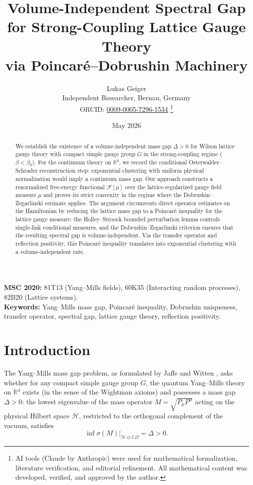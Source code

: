 \documentclass[12pt,a4paper]{article}
\title{\textbf{Volume-Independent Spectral Gap for Strong-Coupling Lattice Gauge Theory\\ via Poincar\'e--Dobrushin Machinery}}
\author{Lukas Geiger\\
\small Independent Researcher, Bernau, Germany\\
\small ORCID: \href{https://orcid.org/0009-0005-7296-1534}{0009-0005-7296-1534}%
\thanks{AI tools (Claude by Anthropic) were used for mathematical formalization, literature verification, and editorial refinement. All mathematical content was developed, verified, and approved by the author.}}
\date{May 2026}
\theoremstyle{definition}
\theoremstyle{plain}
\theoremstyle{remark}
\begin{document}
\maketitle

\noindent\textbf{MSC 2020:} 81T13 (Yang--Mills fields), 60K35 (Interacting random processes), 82B20 (Lattice systems).\\
\textbf{Keywords:} Yang--Mills mass gap, Poincar\'e inequality, Dobrushin uniqueness, transfer operator, spectral gap, lattice gauge theory, reflection positivity.

\begin{abstract}
We establish the existence of a volume-independent mass gap $\Delta > 0$ for Wilson lattice gauge theory with compact simple gauge group $G$ in the strong-coupling regime ($\beta < \beta_0$). For the continuum theory on $\mathbb{R}^4$, we record the conditional Osterwalder--Schrader reconstruction step: exponential clustering with uniform physical normalization would imply a continuum mass gap. Our approach constructs a renormalized free-energy functional $\mathcal{F}[\mu]$ over the lattice-regularized gauge field measure $\mu$ and proves its strict convexity in the regime where the Dobrushin--Zegarlinski estimate applies. The argument circumvents direct operator estimates on the Hamiltonian by reducing the lattice mass gap to a Poincar\'e inequality for the lattice gauge measure: the Holley--Stroock bounded perturbation lemma controls single-link conditional measures, and the Dobrushin--Zegarlinski criterion ensures that the resulting spectral gap is volume-independent. Via the transfer operator and reflection positivity, this Poincar\'e inequality translates into exponential clustering with a volume-independent rate.
\end{abstract}

\clearpage
\tableofcontents
\clearpage

\section{Introduction}

The Yang--Mills mass gap problem, as formulated by Jaffe and Witten \cite{JaffeWitten2000}, asks whether for any compact simple gauge group $G$, the quantum Yang--Mills theory on $\mathbb{R}^4$ exists (in the sense of the Wightman axioms) and possesses a mass gap $\Delta > 0$: the lowest eigenvalue of the mass operator $M = \sqrt{P_\mu P^\mu}$ acting on the physical Hilbert space $\mathcal{H}$, restricted to the orthogonal complement of the vacuum, satisfies
\begin{equation}
    \inf \sigma(M)\big|_{\mathcal{H} \ominus \mathbb{C}\Omega} = \Delta > 0.
\end{equation}
\end{document}
